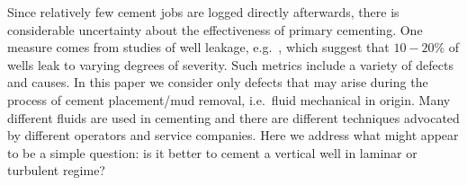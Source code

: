 \documentclass[review]{elsarticle}
\begin{document}
Since relatively few cement jobs are logged directly afterwards, there is considerable uncertainty about the effectiveness of primary cementing. One measure comes from studies of well leakage, e.g.~\cite{Dusseault2014,davies2014}, which
suggest that $10-20$\% of wells leak to varying degrees of severity. Such metrics include a variety of defects and causes. In this paper we consider only defects that may arise during the process of cement placement/mud removal, i.e.~fluid mechanical in origin. Many different fluids are used in cementing and there are different techniques advocated by different operators and service companies. Here we address what might appear to be a simple question: is it better to cement a vertical well in laminar or turbulent regime?

\end{document}
